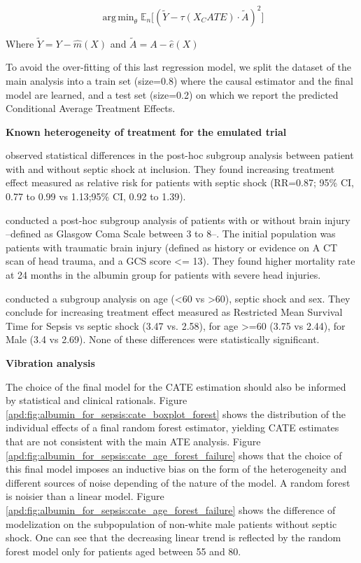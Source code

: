 \documentclass[10pt,letterpaper]{article}
\DeclareMathOperator*{\argmin}{arg\,min}
\begin{document}
$$\argmin_{\theta} \mathbb E_n \big[(\tilde{Y} - \tau (X_CATE) \cdot \tilde{A})^2\big ]$$

Where $\tilde{Y} = Y - \hat m(X)$ and $\tilde{A} = A - \hat e(X)$

To avoid the over-fitting of this last regression model, we split the dataset of
the main analysis into a train set (size=0.8) where the causal estimator and the final
model are learned, and a test set (size=0.2) on which we report the predicted Conditional Average
Treatment Effects.

\textbf{Known heterogeneity of treatment for the emulated trial}\label{apd:cate_literature}

\cite{caironi2014albumin} observed statistical differences in the post-hoc
subgroup analysis between patient with and without septic shock at inclusion.
They found increasing treatment effect measured as relative risk for patients
with septic shock (RR=0.87; 95\% CI, 0.77 to 0.99 vs 1.13;95\% CI, 0.92 to 1.39).

\cite{safe2007saline} conducted a post-hoc subgroup analysis of patients with or
without brain injury --defined as Glasgow Coma Scale between 3 to 8--. The
initial population was patients with traumatic brain injury (defined as history
or evidence on A CT scan of head trauma, and a GCS score <= 13). They found
higher mortality rate at 24 months in the albumin group for patients with severe
head injuries.

\cite{zhou2021early} conducted a subgroup analysis on age (<60 vs >60), septic
shock and sex. They conclude for increasing treatment effect measured as
Restricted Mean Survival Time for Sepsis vs septic shock (3.47 vs. 2.58), for
age >=60 (3.75 vs 2.44), for Male (3.4 vs 2.69). None of these differences were
statistically significant.

\textbf{Vibration analysis}\label{apd:cate_results}

The choice of the final model for the CATE estimation should also be informed
by statistical and clinical rationals. Figure
\ref{apd:fig:albumin_for_sepsis:cate_boxplot_forest} shows the distribution of
the individual effects of a final random forest estimator, yielding CATE
estimates that are not consistent with the main ATE analysis. Figure
\ref{apd:fig:albumin_for_sepsis:cate_age_forest_failure} shows that the choice
of this final model imposes an inductive bias on the form of the heterogeneity
and different sources of noise depending of the nature of the model. A random
forest is noisier than a linear model. Figure
\ref{apd:fig:albumin_for_sepsis:cate_age_forest_failure} shows the difference
of modelization on the subpopulation of non-white male patients without septic
shock. One can see that the decreasing linear trend is reflected by the
random forest model only for patients aged between 55 and 80.
\end{document}
